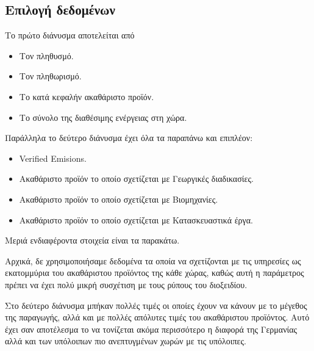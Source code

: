 \documentclass[a4paper,twoside,10pt]{article}
\begin{document}
	\subsection{Επιλογή δεδομένων}
	Το πρώτο διάνυσμα αποτελείται από
	\begin{itemize}
		\item Τον πληθυσμό.
		\item Τον πληθωρισμό.
		\item Το κατά κεφαλήν ακαθάριστο προϊόν.
		\item Το σύνολο της διαθέσιμης ενέργειας στη χώρα.
	\end{itemize}
	Παράλληλα το δεύτερο διάνυσμα έχει όλα τα παραπάνω και επιπλέον:
	\begin{itemize}
		\item Verified Emisions.
		\item Ακαθάριστο προϊόν το οποίο σχετίζεται με Γεωργικές διαδικασίες.
		\item Ακαθάριστο προϊόν το οποίο σχετίζεται με Βιομηχανίες.
		\item Ακαθάριστο προϊόν το οποίο σχετίζεται με Κατασκευαστικά έργα.
	\end{itemize}
	
	Μεριά ενδιαφέροντα στοιχεία είναι τα παρακάτω.
	
	Αρχικά, δε χρησιμοποιήσαμε δεδομένα τα οποία να σχετίζονται με τις υπηρεσίες ως εκατομμύρια του ακαθάριστου προϊόντος της κάθε χώρας, καθώς αυτή η παράμετρος πρέπει να έχει πολύ μικρή συσχέτιση με τους ρύπους του διοξειδίου.
	
	Στο δεύτερο διάνυσμα μπήκαν πολλές τιμές οι οποίες έχουν να κάνουν με το μέγεθος της παραγωγής, αλλά και με πολλές απόλυτες τιμές του ακαθάριστου προϊόντος. Αυτό έχει σαν αποτέλεσμα το να τονίζεται ακόμα περισσότερο η διαφορά της Γερμανίας αλλά και των υπόλοιπων πιο ανεπτυγμένων χωρών με τις υπόλοιπες. 
	
	
	
	
\end{document}
